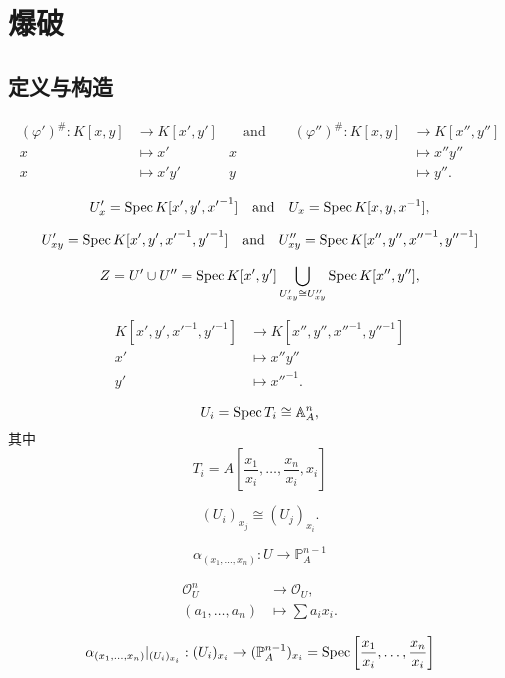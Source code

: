 \section{爆破}\label{s:4.2}

\subsection{定义与构造}\label{s:4.2.1}


\[
	\begin{aligned}
		(\varphi')^\#:K[x,y]&\longrightarrow K[x',y']&\quad \text{and}\qquad (\varphi'')^\#:K[x,y]&\longrightarrow K[x'',y'']\\
		x&\longmapsto x'& x&\longmapsto x''y''\\
		x&\longmapsto x'y'& y&\longmapsto y''.
	\end{aligned}
\]

\[
	U'_x=\operatorname{Spec} K[x',y',{x'}^{-1}]\quad \text{and}\quad 
	U_x=\operatorname{Spec} K[x,y,x^{-1}],
\]

\[
	U'_{xy}=\operatorname{Spec} K[x',y',{x'}^{-1},{y'}^{-1}]\quad \text{and}\quad 
	U''_{xy}=\operatorname{Spec} K[x'',y'',{x''}^{-1},{y''}^{-1}]
\]

\[
	Z=U'\cup U''=\operatorname{Spec} K[x',y']\bigcup_{U'_{xy}\cong U''_{xy}}\operatorname{Spec} K[x'',y''],
\]

\[
	\begin{aligned}
		K[x',y',{x'}^{-1},{y'}^{-1}]&\longrightarrow 
		K[x'',y'',{x''}^{-1},{y''}^{-1}]\\
		x'&\longmapsto x''y''\\
		y'&\longmapsto {x''}^{-1}.
	\end{aligned}
\]




\[
	U_i=\operatorname{Spec} T_i\cong \mathbb A_A^n,
\]
其中
\[
	T_i=A\left[\frac{x_1}{x_i},\dots,\frac{x_n}{x_i},x_i\right]
\]

\[
	(U_i)_{x_j}\cong (U_j)_{x_i}.
\]


\[
	\alpha_{(x_1,\dots,x_n)}:U\to \mathbb P_A^{n-1}
\]

\[
	\begin{aligned}
		\mathscr O_U^n & \longrightarrow \mathscr O_U,\\
		(a_1,\dots,a_n)&\longmapsto \sum a_ix_i.
	\end{aligned}
\]

\[
	\alpha_{(x_1,\dots,x_n)}|_{(U_i)_{x_i}}:(U_i)_{x_i}\to (\mathbb P_A^{n-1})_{x_i}=\operatorname{Spec} \left[\frac{x_1}{x_i},\dots,\frac{x_n}{x_i}\right]
\]

